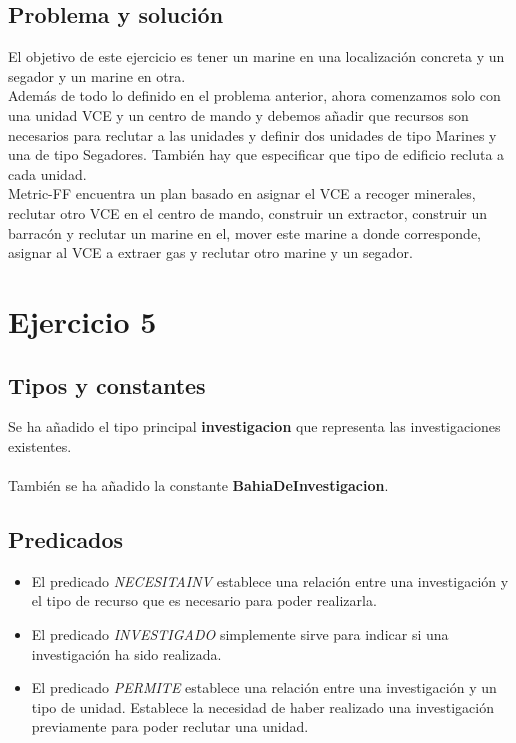 \subsection{Problema y solución}
El objetivo de este ejercicio es tener un marine en una localización concreta y un segador y un marine en otra.\\
Además de todo lo definido en el problema anterior, ahora comenzamos solo con una unidad VCE y un centro de mando y debemos añadir que recursos son necesarios para reclutar a las unidades y definir dos unidades de tipo Marines y una de tipo Segadores. También hay que especificar que tipo de edificio recluta a cada unidad.\\
Metric-FF encuentra un plan basado en asignar el VCE a recoger minerales, reclutar otro VCE en el centro de mando, construir un extractor, construir un barracón y reclutar un marine en el, mover este marine a donde corresponde, asignar al VCE a extraer gas y reclutar otro marine y un segador.


\section{Ejercicio 5}

\subsection{Tipos y constantes}
Se ha añadido el tipo principal \textbf{investigacion} que representa las investigaciones existentes.
\\\\
También se ha añadido la constante \textbf{BahiaDeInvestigacion}.
\subsection{Predicados}
\begin{itemize}
   \item El predicado \textit{NECESITAINV} establece una relación entre una investigación y el tipo de recurso que es necesario para poder realizarla.
   \item El predicado \textit{INVESTIGADO} simplemente sirve para indicar si una investigación ha sido realizada.
   \item El predicado \textit{PERMITE} establece una relación entre una investigación y un tipo de unidad. Establece la necesidad de haber realizado una investigación previamente para poder reclutar una unidad.
\end{itemize}
